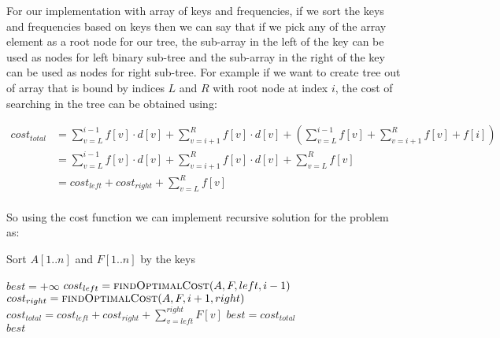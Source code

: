 \documentclass[11pt]{article}
\theoremstyle{definition}
\begin{document}
    For our implementation with array of keys and frequencies, if we sort the keys and frequencies based on keys then we can say that if we pick any of the array element as a root node for our tree, the sub-array in the left of the key can be used as nodes for left binary sub-tree and the sub-array in the right of the key can be used as nodes for right sub-tree. For example if we want to create tree out of array that is bound by indices $L$ and $R$ with root node at index $i$, the cost of searching in the tree can be obtained using: 
     \begin{center}
        \begin{align*}
            cost_{total} &= \sum_{v=L}^{i-1} f[v]\cdot d[v] + \sum_{v = i + 1}^{R} f[v]\cdot d[v] + \left(\sum_{v=L}^{i-1} f[v] + \sum_{v = i + 1}^{R} f[v] + f[i]\right)\\
            &= \sum_{v=L}^{i-1} f[v]\cdot d[v] + \sum_{v = i + 1}^{R} f[v]\cdot d[v] + \sum_{v=L}^{R} f[v]\\
            &= cost_{left} + cost_{right} + \sum_{v=L}^{R} f[v]\\
        \end{align*}
    \end{center}
So using the cost function we can implement recursive solution for the problem as:

\begin{algorithm}[H]
\caption{}\label{Main}
\begin{algorithmic}[1]
\State Sort $A[1..n]$ and $F[1..n]$ by the keys
\State \Return {}
\end{algorithmic}
\end{algorithm}

\begin{algorithm}[H]
\caption{}\label{findOptimalCost}
\begin{algorithmic}[1]
\State $best = +\infty$
 
    \State $cost_{left} = \Call{findOptimalCost}{A, F, left, i-1}$
    \State $cost_{right} = \Call{findOptimalCost}{A, F, i+1, right}$
    \State $cost_{total} = cost_{left} + cost_{right} + \sum_{v=left}^{right} F[v]$
      \State $best = cost_{total}$
    \EndIf
\EndFor\\
\Return $best$
\end{algorithmic}
\end{algorithm}
\end{document}
